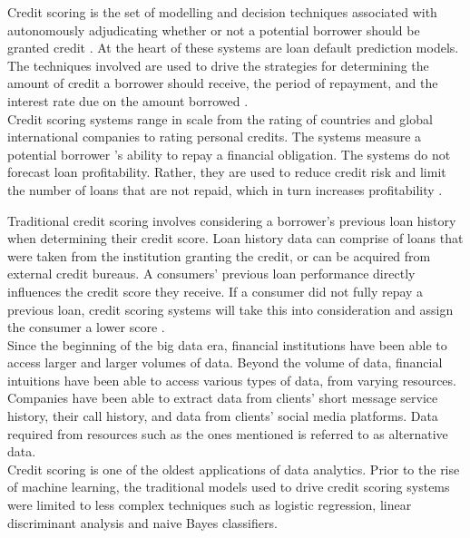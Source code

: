 Credit scoring is the set of modelling and decision techniques associated with autonomously adjudicating whether or not a potential borrower should be granted credit \parencite{PerceptronScoring}. At the heart of these systems are loan default prediction models. The techniques involved are used to drive the strategies for determining the amount of credit a borrower should receive, the period of repayment, and the interest rate due on the amount borrowed \parencite{CreditRiskSummary}. \\

Credit scoring systems range in scale from the rating of countries and global international companies to rating personal credits. The systems measure a potential borrower 's ability to repay a financial obligation. The systems do not forecast loan profitability. Rather, they are used to reduce credit risk and limit the number of loans that are not repaid, which in turn increases profitability \parencite{EarlyNNScoring}. \newpage

Traditional credit scoring involves considering a borrower's previous loan history when determining their credit score. Loan history data can comprise of loans that were taken from the institution granting the credit, or can be acquired from external credit bureaus. A consumers' previous loan performance directly influences the credit score they receive. If a consumer did not fully repay a previous loan, credit scoring systems will take this into consideration and assign the consumer a lower score \parencite{DynamicBehaviouralScoring}. \\

Since the beginning of the big data era, financial institutions have been able to access larger and larger volumes of data. Beyond the volume of data, financial intuitions have been able to access various types of data, from varying resources. Companies have been able to extract data from clients' short message service history, their call history, and data from clients' social media platforms. Data required from resources such as the ones mentioned is referred to as alternative data.\\

Credit scoring is one of the oldest applications of data analytics. Prior to the rise of machine learning, the traditional models used to drive credit scoring systems were limited to less complex techniques such as logistic regression, linear discriminant analysis and naive Bayes classifiers.\\

